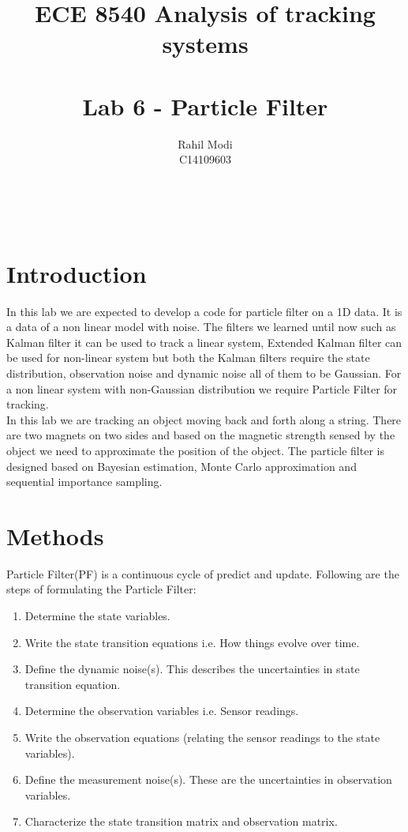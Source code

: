 \documentclass[12pt]{article}
\begin{document}

\title{\Huge{\bf ECE 8540 Analysis of tracking systems}\\ 
\\ 
\huge Lab 6 - Particle Filter}\\
\author{\LARGE Rahil Modi\\
C14109603}
\maketitle
\clearpage
\section{Introduction}
In this lab we are expected to develop a code for particle filter on a 1D data. It is a data of a non linear model with noise. The filters we learned until now such as Kalman filter it can be used to track a linear system, Extended Kalman filter can be used for non-linear system but both the Kalman filters require the state distribution, observation noise and dynamic noise all of them to be Gaussian. For a non linear system with non-Gaussian distribution we require Particle Filter for tracking.\\
In this lab we are tracking an object moving back and forth along a string. There are two magnets on two sides and based on the magnetic strength sensed by the object we need to approximate the position of the object. The particle filter is designed based on Bayesian estimation, Monte Carlo approximation and sequential importance sampling.
\section{Methods}
Particle Filter(PF) is a continuous cycle of predict and update. Following are the steps of formulating the Particle Filter:
\begin{enumerate}
	\item Determine the state variables.
	\item Write the state transition equations i.e. How things evolve over time.
	\item Define the dynamic noise(s).  This describes the uncertainties in state transition equation.
	\item Determine the observation variables i.e. Sensor readings.
	\item Write the observation equations (relating the sensor readings to the state variables).
	\item Define the measurement noise(s). These are the uncertainties in observation variables.
	\item Characterize the state transition matrix and observation matrix.
\end{enumerate}
\end{document}
